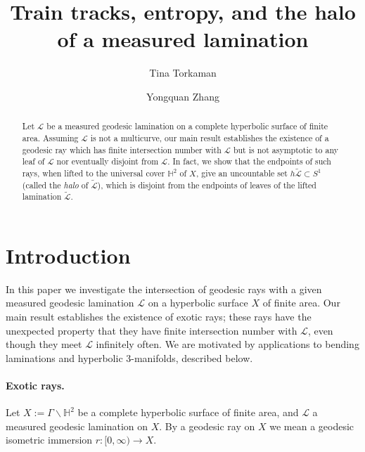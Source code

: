 \documentclass[11pt]{article} %
\title{\bfseries Train tracks, entropy, and the halo of a measured lamination}
\author{Tina Torkaman}
\author{Yongquan Zhang}
\affil{\small Department of Mathematics, Harvard University}
\theoremstyle{plain}
\theoremstyle{definition}
\numberwithin{equation}{section}
\begin{document}
\maketitle


\begin{abstract}
Let $\mathcal{L}$ be a measured geodesic lamination on a complete hyperbolic surface of finite area. Assuming $\mathcal{L}$ is not a multicurve, our main result establishes the existence of a geodesic ray which has finite intersection number with $\mathcal{L}$ but is not asymptotic to any leaf of $\mathcal{L}$ nor eventually disjoint from $\mathcal{L}$. In fact, we show that the endpoints of such rays, when lifted to the universal cover $\mathbb{H}^2$ of $X$, give an uncountable set $h\tilde{\mathcal{L}}\subset S^1$ (called the \emph{halo} of $\tilde{\mathcal{L}}$), which is disjoint from the endpoints of leaves of the lifted lamination $\tilde{\mathcal{L}}$.

\end{abstract}
\begin{center}
\begin{minipage}{0.9\linewidth}
    \tableofcontents
\end{minipage}
\end{center}
\thispagestyle{empty}
\newpage

\clearpage
{} 
\section{Introduction}

In this paper we investigate the intersection of geodesic rays with a given measured geodesic lamination $\mathcal{L}$ on a hyperbolic surface $X$ of finite area. Our main result establishes the existence of exotic rays; these rays have the unexpected property that they have finite intersection number with $\mathcal{L}$, even though they meet $\mathcal{L}$ infinitely often. We are motivated by applications to bending laminations and hyperbolic 3-manifolds, described below.

\paragraph{Exotic rays.}
Let $X:=\Gamma\backslash\mathbb{H}^2$ be a complete hyperbolic surface of finite area, and $\mathcal{L}$ a measured geodesic lamination on $X$. By a geodesic ray on $X$ we mean a geodesic isometric immersion $r:[0,\infty)\to X$.
\end{document}
